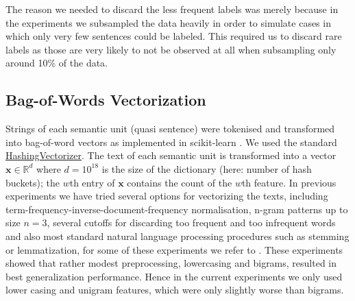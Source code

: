 \documentclass[runningheads,a4paper]{article}
\renewcommand{\vec}[1]{\mathbf{#1}}
\begin{document}
The reason we needed to discard the less frequent labels was merely because in the experiments we subsampled the data heavily in order to simulate cases in which only very few sentences could be labeled. This required us to discard rare labels as those are very likely to not be observed at all when subsampling only around 10\% of the data. 

\subsection{Bag-of-Words Vectorization}\label{sec:bow-vectorization}
Strings of each semantic unit (quasi sentence) were tokenised and transformed into bag-of-word vectors as implemented in scikit-learn \cite{scikit-learn}. We used the standard \href{http://scikit-learn.org/stable/modules/generated/sklearn.feature_extraction.text.HashingVectorizer.html}{HashingVectorizer}. The text of each semantic unit is transformed into a vector $\vec{x}\in\mathds{R}^d$ where $d=10^18$ is the size of the dictionary (here: number of hash buckets); the $w$th entry of $\vec{x}$ contains the count of the $w$th feature. In previous experiments we have tried several options for vectorizing the texts, including term-frequency-inverse-document-frequency normalisation, n-gram patterns up to size $n=3$, several cutoffs for discarding too frequent and too infrequent words and also most standard natural language processing procedures such as stemming or lemmatization, for some of these experiments we refer to \cite{Biessmann16}. These experiments showed that rather modest preprocessing, lowercasing and bigrams, resulted in best generalization performance. Hence in the current experiments we only used lower casing and unigram features, which were only slightly worse than bigrams. 
\end{document}
